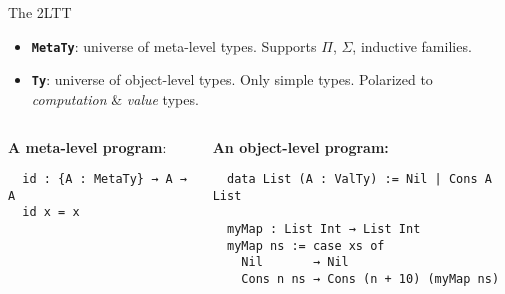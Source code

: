 \documentclass[dvipsnames,aspectratio=169]{beamer}
\newcommand{\ttt}[1]{{\texttt{#1}}}
\theoremstyle{remark}
\begin{document}


\begin{frame}[fragile]{The 2LTT}

\begin{itemize}
  \item \textbf{\ttt{MetaTy}}: universe of meta-level types. Supports $\Pi$, $\Sigma$, inductive families.
  \item \textbf{\ttt{Ty}}: universe of object-level types. Only simple types. Polarized to \emph{computation} \& \emph{value} types.
\end{itemize}
\vspace{2em}

\begin{columns}
\begin{column}{0.4\textwidth}
\textbf{A meta-level program}:
\begin{verbatim}
  id : {A : MetaTy} → A → A
  id x = x




\end{verbatim}
\end{column}

\begin{column}{0.6\textwidth}
\textbf{An object-level program:}
\begin{verbatim}
  data List (A : ValTy) := Nil | Cons A List

  myMap : List Int → List Int
  myMap ns := case xs of
    Nil       → Nil
    Cons n ns → Cons (n + 10) (myMap ns)
\end{verbatim}
\end{column}
\end{columns}


\end{frame}
\end{document}
